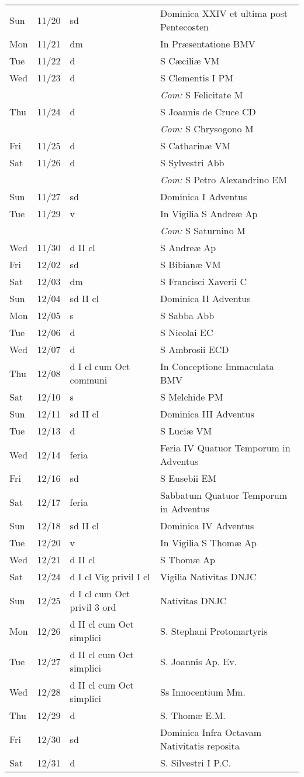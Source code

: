 \documentclass[10pt]{article}
\begin{document}
\begin{longtable}{ l l l l }
Sun & 11/20 & sd & Dominica XXIV et ultima post Pentecosten\\
Mon & 11/21 & dm & In Præsentatione BMV\\
Tue & 11/22 & d & S Cæciliæ VM\\
Wed & 11/23 & d & S Clementis I PM\\
 & & & \textit{Com:} S Felicitate M\\
Thu & 11/24 & d & S Joannis de Cruce CD\\
 & & & \textit{Com:} S Chrysogono M\\
Fri & 11/25 & d & S Catharinæ VM\\
Sat & 11/26 & d & S Sylvestri Abb\\
 & & & \textit{Com:} S Petro Alexandrino EM\\
Sun & 11/27 & sd & Dominica I Adventus\\
Tue & 11/29 & v & In Vigilia S Andreæ Ap\\
 & & & \textit{Com:} S Saturnino M\\
Wed & 11/30 & d II cl & S Andreæ Ap\\
Fri & 12/02 & sd & S Bibianæ VM\\
Sat & 12/03 & dm & S Francisci Xaverii C\\
Sun & 12/04 & sd II cl & Dominica II Adventus\\
Mon & 12/05 & s & S Sabba Abb\\
Tue & 12/06 & d & S Nicolai EC\\
Wed & 12/07 & d & S Ambrosii ECD\\
Thu & 12/08 & d I cl cum Oct communi & In Conceptione Immaculata BMV\\
Sat & 12/10 & s & S Melchide PM\\
Sun & 12/11 & sd II cl & Dominica III Adventus\\
Tue & 12/13 & d & S Luciæ VM\\
Wed & 12/14 & feria & Feria IV Quatuor Temporum in Adventus\\
Fri & 12/16 & sd & S Eusebii EM\\
Sat & 12/17 & feria & Sabbatum Quatuor Temporum in Adventus\\
Sun & 12/18 & sd II cl & Dominica IV Adventus\\
Tue & 12/20 & v & In Vigilia S Thomæ Ap\\
Wed & 12/21 & d II cl & S Thomæ Ap\\
Sat & 12/24 & d I cl Vig privil I cl & Vigilia Nativitas DNJC\\
Sun & 12/25 & d I cl cum Oct privil 3 ord & Nativitas DNJC\\
Mon & 12/26 & d II cl cum Oct simplici & S. Stephani Protomartyris\\
Tue & 12/27 & d II cl cum Oct simplici & S. Joannis Ap. Ev.\\
Wed & 12/28 & d II cl cum Oct simplici & Ss Innocentium Mm.\\
Thu & 12/29 & d & S. Thomæ E.M.\\
Fri & 12/30 & sd & Dominica Infra Octavam Nativitatis reposita\\
Sat & 12/31 & d & S. Silvestri I P.C.\\
\end{longtable}
\end{document}
